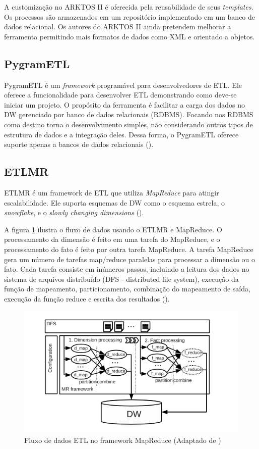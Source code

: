 A customização no ARKTOS II é oferecida pela reusabilidade de seus \textit{templates}. Os processos são armazenados em um repositório implementado em um banco de dados relacional. Os autores do ARKTOS II ainda pretendem melhorar a ferramenta permitindo mais formatos de dados como XML e orientado a objetos.


\subsection{PygramETL}

PygramETL é um \textit{framework} programável para desenvolvedores de ETL. Ele oferece a funcionalidade para desenvolver ETL demonstrando como deve-se iniciar um projeto. O propósito da ferramenta é facilitar a carga dos dados no DW gerenciado por banco de dados relacionais (RDBMS). Focando nos RDBMS como destino torna o desenvolvimento simples, não considerando outros tipos de estrutura de dados e a integração deles. Dessa forma, o PygramETL oferece suporte apenas a bancos de dados relacionais (\cite{thomsen:2009}).

\subsection{ETLMR}

ETLMR é um framework de ETL que utiliza \textit{MapReduce} para atingir escalabilidade. Ele suporta esquemas de DW como o esquema estrela, o \textit{snowflake}, e o \textit{slowly changing dimensions} (\cite{liu:2011}). 

A figura \ref{etlmr} ilustra o fluxo de dados usando o ETLMR e MapReduce. O processamento da dimensão é feito em uma tarefa do MapReduce, e o processamento do fato é feito por outra tarefa MapReduce. A tarefa MapReduce gera um número de tarefas map/reduce paralelas para processar a dimensão ou o fato. Cada tarefa consiste em inúmeros passos, incluindo a leitura dos dados no sistema de arquivos distribuído (DFS - distributed file system), execução da função de mapeamento, particionamento, combinação do mapeamento de saída, execução da função reduce e escrita dos resultados (\cite{liu:2011}).

\begin{figure}
	\centering
	\includegraphics[scale=0.9]{fig/etlmr.png}
	\caption{Fluxo de dados ETL no framework MapReduce (Adaptado de \cite{liu:2011})}
	\label{etlmr}
\end{figure}

